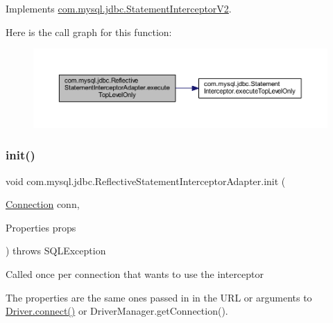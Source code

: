 Implements \mbox{\hyperlink{interfacecom_1_1mysql_1_1jdbc_1_1_statement_interceptor_v2_a36f03c5f5b1755d48549862d5b6c627f}{com.\+mysql.\+jdbc.\+Statement\+Interceptor\+V2}}.

Here is the call graph for this function\+:
\nopagebreak
\begin{figure}[H]
\begin{center}
\leavevmode
\includegraphics[width=350pt]{classcom_1_1mysql_1_1jdbc_1_1_reflective_statement_interceptor_adapter_abe31396aeda856d1ef66a90f95b3d3c0_cgraph}
\end{center}
\end{figure}
\mbox{\label{classcom_1_1mysql_1_1jdbc_1_1_reflective_statement_interceptor_adapter_ae2a1db7cc624f326d2a0bf7d1b5b6e3d}} 
\subsubsection{\texorpdfstring{init()}{init()}}
{\footnotesize\ttfamily void com.\+mysql.\+jdbc.\+Reflective\+Statement\+Interceptor\+Adapter.\+init (\begin{DoxyParamCaption}\item[{\mbox{\hyperlink{interfacecom_1_1mysql_1_1jdbc_1_1_connection}{Connection}}}]{conn,  }\item[{Properties}]{props }\end{DoxyParamCaption}) throws S\+Q\+L\+Exception}

Called once per connection that wants to use the interceptor

The properties are the same ones passed in in the U\+RL or arguments to \mbox{\hyperlink{classcom_1_1mysql_1_1jdbc_1_1_non_registering_driver_a834c012e752a01d1ee435b3461bb8218}{Driver.\+connect()}} or Driver\+Manager.\+get\+Connection().


